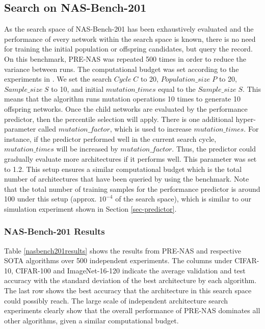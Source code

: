 \documentclass[sigconf]{acmart}
\begin{document}
\subsection{Search on NAS-Bench-201}
\label{search_on_nasbench201}
As the search space of NAS-Bench-201 has been exhaustively evaluated and the performance of every network within the search space is known, there is no need for training the initial population or offspring candidates, but query the record.  On this benchmark, PRE-NAS was repeated 500 times in order to reduce the variance between runs. The computational budget was set according to the experiments in \cite{Ref:45}. We set the search $Cycle \; C$ to 20,  $Population\_size \; P$ to 20, $Sample\_size \; S$ to 10, and initial $mutation\_times$ equal to the $Sample\_size \; S$.  This means that the algorithm runs mutation operations 10 times to generate 10 offspring networks.  Once the child networks are evaluated by the performance predictor, then the percentile selection will apply.  There is one additional hyper-parameter called $mutation\_factor$, which is used to increase $mutation\_times$.  For instance, if the predictor performed well in the current search cycle, $mutation\_times$ will be increased by $mutation\_factor$.  Thus, the predictor could gradually evaluate more architectures if it performs well.  This parameter was set to 1.2.  This setup ensures a similar computational budget which is the total number of architectures that have been queried by using the benchmark. Note that the total number of training samples for the performance predictor is around 100 under this setup (approx. $10^{-4}$ of the search space), which is similar to our simulation experiment shown in Section \ref{sec-predictor}.

\subsubsection{NAS-Bench-201 Results}
Table \ref{nasbench201results} shows the results from PRE-NAS and respective SOTA algorithms over 500 independent experiments.  The columns under CIFAR-10, CIFAR-100 and ImageNet-16-120 indicate the average validation and test accuracy with the standard deviation of the best architecture by each algorithm.  The last row shows the best accuracy that the architecture in this search space could possibly reach. The large scale of independent architecture search experiments clearly show that the overall performance of PRE-NAS dominates all other algorithms, given a similar computational budget.
\end{document}
